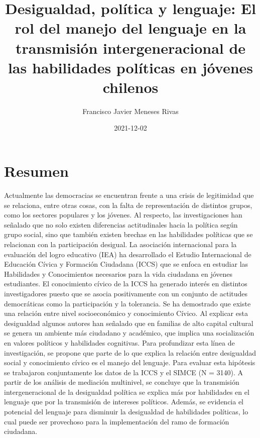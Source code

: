 \documentclass[12pt,twoside]{templates/facsothesis}
\title{Desigualdad, política y lenguaje: El rol del manejo del lenguaje en la transmisión intergeneracional de las habilidades políticas en jóvenes chilenos}
\author{Francisco Javier Meneses Rivas}
\date{2021-12-02}
\begin{document}

  \maketitle

\frontmatter %
\pagestyle{empty} %



  \setcounter{tocdepth}{1}
  \setlength{\parskip}{0pt}
  \tableofcontents

\setlength\parskip{1em plus 0.1em minus 0.2em}

  \listoftables

  \listoffigures



\mainmatter %
\pagestyle{fancyplain} %

\hypertarget{resumen}{%
\chapter*{Resumen}\label{resumen}}

Actualmente las democracias se encuentran frente a una crisis de legitimidad que se relaciona, entre otras cosas, con la falta de representación de distintos grupos, como los sectores populares y los jóvenes. Al respecto, las investigaciones han señalado que no solo existen diferencias actitudinales hacia la política según grupo social, sino que también existen brechas en las habilidades políticas que se relacionan con la participación desigual. La asociación internacional para la evaluación del logro educativo (IEA) ha desarrollado el Estudio Internacional de Educación Cívica y Formación Ciudadana (ICCS) que se enfoca en estudiar las Habilidades y Conocimientos necesarios para la vida ciudadana en jóvenes estudiantes. El conocimiento cívico de la ICCS ha generado interés en distintos investigadores puesto que se asocia positivamente con un conjunto de actitudes democráticas como la participación y la tolerancia. Se ha demostrado que existe una relación entre nivel socioeconómico y conocimiento Cívico. Al explicar esta desigualdad algunos autores han señalado que en familias de alto capital cultural se genera un ambiente más ciudadano y académico, que implica una socialización en valores políticos y habilidades cognitivas. Para profundizar esta línea de investigación, se propone que parte de lo que explica la relación entre desigualdad social y conocimiento cívico es el manejo del lenguaje. Para evaluar esta hipótesis se trabajaron conjuntamente los datos de la ICCS y el SIMCE (N = 3140). A partir de los análisis de mediación multinivel, se concluye que la transmisión intergeneracional de la desigualdad política se explica más por habilidades en el lenguaje que por la transmisión de intereses políticos. Además, se evidencia el potencial del lenguaje para disminuir la desigualdad de habilidades políticas, lo cual puede ser provechoso para la implementación del ramo de formación ciudadana.
\end{document}
